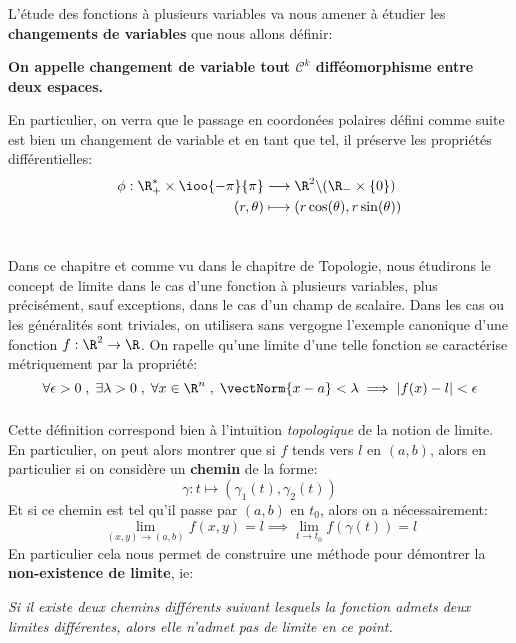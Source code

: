 \subsection*{}
L'étude des fonctions à plusieurs variables va nous amener à étudier les \textbf{changements de variables} que nous allons définir:
\begin{center}
   \textbf{On appelle changement de variable tout \(\mathcal{C}^k\) difféomorphisme entre deux espaces.}
\end{center}
En particulier, on verra que le passage en coordonées polaires défini comme suite est bien un changement de variable et en tant que tel, il préserve les propriétés différentielles:
\[
   \begin{aligned}
      \phi : \R_+^* \times \ioo{-\pi}{\pi} &\longrightarrow \R^2 \backslash (\R_- \times \{0\})\\
      (r, \theta) &\longmapsto (r\cos(\theta), r\sin(\theta))
   \end{aligned}
\]

\chapter*{}
Dans ce chapitre et comme vu dans le chapitre de Topologie, nous étudirons le concept de limite dans le cas d'une fonction à plusieurs variables, plus précisément, sauf exceptions, dans le cas d'un champ de scalaire. Dans les cas ou les généralités sont triviales, on utilisera sans vergogne l'exemple canonique d'une fonction \(f : \R^2 \rightarrow \R\). On rapelle qu'une limite d'une telle fonction se caractérise métriquement par la propriété:
\[
   \forall \epsilon >0 \; , \; \exists \lambda > 0 \; , \; \forall x \in \R^n \; , \; \vectNorm{x - a} < \lambda \implies |f(x) - l| < \epsilon
\]

\subsection*{}
Cette définition correspond bien à l'intuition \textit{topologique} de la notion de limite. En particulier, on peut alors montrer que si \(f\) tends vers \(l\) en \((a, b)\), alors en particulier si on considère un \textbf{chemin} de la forme:
\[
   \gamma : t \mapsto (\gamma_1(t), \gamma_2(t))   
\]
Et si ce chemin est tel qu'il passe par \((a, b)\) en \(t_0\), alors on a nécessairement:
\[
   \lim_{(x, y) \rightarrow (a, b)} f(x, y) = l \implies \lim_{t \rightarrow t_0} f(\gamma(t)) = l
\]
En particulier cela nous permet de construire une méthode pour démontrer la \textbf{non-existence de limite}, ie:
\begin{center}
   \textit{Si il existe deux chemins différents suivant lesquels la fonction admets deux limites différentes, alors elle n'admet pas de limite en ce point.}
\end{center}
